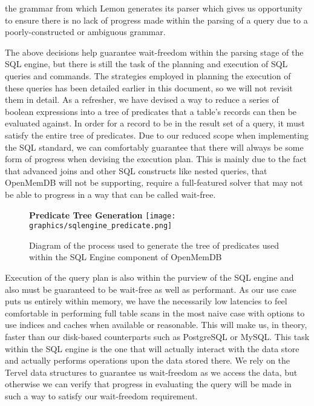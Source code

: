 \documentclass[letterpaper, 12pt]{article}
\begin{document}
  the grammar from which Lemon generates its parser which gives us opportunity to ensure there
  is no lack of progress made within the parsing of a query due to a poorly-constructed or ambiguous
  grammar.
  \par\vspace{\baselineskip}
  The above decisions help guarantee wait-freedom within the parsing stage of the SQL engine, but there
  is still the task of the planning and execution of SQL queries and commands. The strategies employed in
  planning the execution of these queries has been detailed earlier in this document, so we will not
  revisit them in detail. As a refresher, we have devised a way to reduce a series of boolean expressions
  into a tree of predicates that a table's records can then be evaluated against. In order for a record
  to be in the result set of a query, it must satisfy the entire tree of predicates. Due to our reduced scope
  when implementing the SQL standard, we can comfortably guarantee that there will always be some form
  of progress when devising the execution plan. This is mainly due to the fact that advanced joins and
  other SQL constructs like nested queries, that OpenMemDB will not be supporting, require a full-featured
  solver that may not be able to progress in a way that can be called wait-free.
  \par\vspace{\baselineskip}
  \begin{figure}
   \centering
   \textbf{Predicate Tree Generation}
   \texttt{[image: graphics/sqlengine\_predicate.png]}
   \caption{Diagram of the process used to generate the tree of predicates
	    used within the SQL Engine component of OpenMemDB}
  \end{figure}
  \par\vspace{\baselineskip}
  Execution of the query plan is also within the purview of the SQL engine and also must be guaranteed to be
  wait-free as well as performant. As our use case puts us entirely within memory, we have the necessarily low
  latencies to feel comfortable in performing full table scans in the most naive case with options to
  use indices and caches when available or reasonable. This will make us, in theory, faster than our disk-based
  counterparts such as PostgreSQL or MySQL. This task within the SQL engine is the one that will actually
  interact with the data store and actually performs operations upon the data stored there. We rely on the Tervel
  data structures to guarantee us wait-freedom as we access the data, but otherwise we can verify that
  progress in evaluating the query will be made in such a way to satisfy our wait-freedom requirement.
  \par\vspace{\baselineskip}
\end{document}
